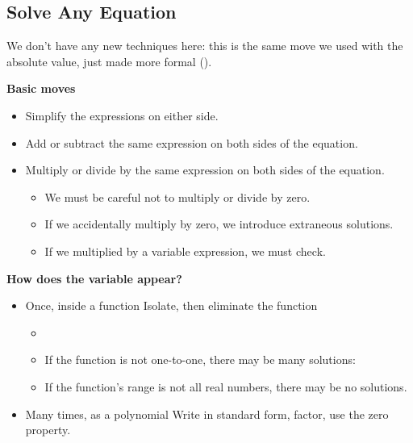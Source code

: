 \subsection{Solve Any Equation} 
We don't have any new techniques here: this is the same move we used with the absolute value, just made more formal ().
\begin{fact}
\textbf{Basic moves}
\begin{itemize}
\item Simplify the expressions on either side.
\item Add or subtract the same expression on both sides of the equation.
\item Multiply or divide by the same expression on both sides of the equation.
\begin{itemize}
\item We must be careful not to multiply or divide by zero.
\item If we accidentally multiply by zero, we introduce extraneous solutions.
\item If we multiplied by a variable expression, we must check.
\end{itemize}
\end{itemize}
\textbf{How does the variable appear?}
\begin{itemize}
\item Once, inside a function {\textrightarrow} Isolate, then eliminate the function
\begin{itemize}
\item {}
\item If the function is not one-to-one, there may be many solutions: 
\item If the function's range is not all real numbers, there may be no solutions.
\end{itemize}
\item Many times, as a polynomial {\textrightarrow} Write in standard form, factor, use the zero property.
\end{itemize}
\end{fact}